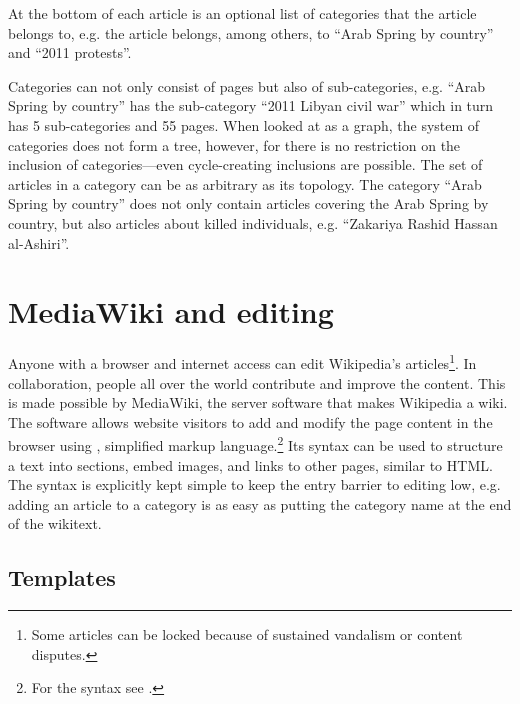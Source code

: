 At the bottom of each article is an optional list of categories that the article belongs to, e.g. the article  belongs, among others, to ``Arab Spring by country'' and ``2011 protests''.

Categories can not only consist of pages but also of sub-categories, e.g. ``Arab Spring by country'' has the sub-category ``2011 Libyan civil war'' which in turn has 5 sub-categories and 55 pages.
When looked at as a graph, the system of categories does not form a tree, however, for there is no restriction on the inclusion of categories---even cycle-creating inclusions are possible.
The set of articles in a category can be as arbitrary as its topology.
The category ``Arab Spring by country'' does not only contain articles covering the Arab Spring by country, but also articles about killed individuals, e.g. ``Zakariya Rashid Hassan al-Ashiri''. 

\section{MediaWiki and editing}

Anyone with a browser and internet access can edit Wikipedia's articles\footnote{Some articles can be locked because of sustained vandalism or content disputes.\cite{wpprotectionpolicy}}.
In collaboration, people all over the world contribute and improve the content. 
This is made possible by MediaWiki, the server software that makes Wikipedia a wiki. 
The software allows website visitors to add and modify the page content in the browser using , simplified markup language.\footnote{For the syntax see .}
Its syntax can be used to structure a text into sections, embed images, and links to other pages, similar to \ac{HTML}.
The syntax is explicitly kept simple to keep the entry barrier to editing low, e.g. adding an article  to a category is as easy as putting the category name at the end of the wikitext.

\subsection{Templates}\label{sub:templates}

